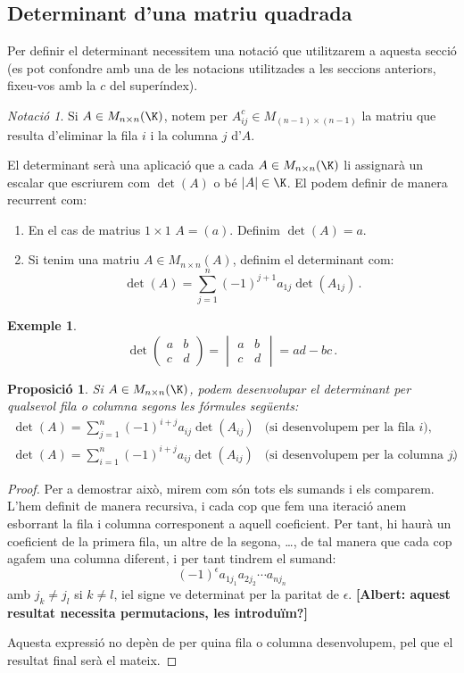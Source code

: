 \documentclass[a4paper,12pt,twoside]{article}
\newcommand{\1}{\mathbf{1}}
\newcommand{\0}{\mathbf{0}}
\newtheorem{proposicio}[teorema]{Proposició}
\theoremstyle{definition}
\newtheorem{exemple}[teorema]{Exemple}
\theoremstyle{remark}
\newtheorem{notacio}[teorema]{Notació}
\begin{document}
\subsection{Determinant d'una matriu quadrada}
 Per definir el determinant necessitem una notació que utilitzarem a aquesta secció (es pot confondre amb una de les notacions utilitzades a les seccions anteriors, fixeu-vos amb la $c$ del superíndex).
\begin{notacio}
	Si $A\in M_{n\times n}(\K)$, notem per $A^c_{ij}\in M_{(n-1)\times(n-1)}$ la matriu que resulta d'eliminar la fila $i$ i la columna $j$ d'$A$. 
\end{notacio}
El determinant serà una aplicació que a cada $A\in M_{n\times n}(\K)$ li assignarà un escalar que escriurem com $\det(A)$ o bé $|A|\in \K$. El podem definir de manera recurrent com:
\begin{enumerate}
	\item En el cas de matrius $1\times 1$ $A=(a)$. Definim $\det(A)=a$.
	\item Si tenim una matriu $A \in M_{n\times n}(A)$, definim el determinant com:
	$$
	\det(A)=\sum_{j=1}^n (-1)^{j+1} a_{1j} \det(A_{1j}) \,.
	$$
\end{enumerate} 
\begin{exemple}
	$$
	\det\begin{pmatrix}
	a & b \\ c & d
	\end{pmatrix} =
	\begin{vmatrix}
	a & b \\ c & d
	\end{vmatrix}=ad-bc \,.
	$$
\end{exemple}
\begin{proposicio}\label{prop:defdet}
	Si $A\in M_{n\times n}(\K)$, podem desenvolupar el determinant per qualsevol fila o columna segons les fórmules següents:
	$$
	\begin{array}{ll}
	\det(A)=\sum_{j=1}^n (-1)^{i+j} a_{ij} \det(A_{ij}) & \text{(si desenvolupem per la fila $i$)},\\[3mm]
	\det(A)=\sum_{i=1}^n (-1)^{i+j} a_{ij} \det(A_{ij}) & \text{(si desenvolupem per la columna $j$)}.
	\end{array}
	$$
\end{proposicio}
\begin{proof}
	Per a demostrar això, mirem com són tots els sumands i els comparem. L'hem definit de manera recursiva, i cada cop que fem una iteració anem esborrant la fila i columna corresponent a aquell coeficient. Per tant, hi haurà un coeficient de la primera fila, un altre de la segona, \ldots, de tal manera que cada cop agafem una columna diferent, i per tant tindrem el sumand:
	\begin{equation}\label{eq:sumanddet}
	(-1)^\epsilon a_{1j_1} a_{2j_2} \cdots a_{nj_n}
	\end{equation}
	amb $j_k\neq j_l$ si $k\neq l$, iel signe ve determinat per la paritat de $\epsilon$. \textbf{[Albert: aquest resultat necessita permutacions, les introduïm?]}
	
	Aquesta expressió no depèn de per quina fila o columna desenvolupem, pel que el resultat final serà el mateix.
\end{proof}
\end{document}
